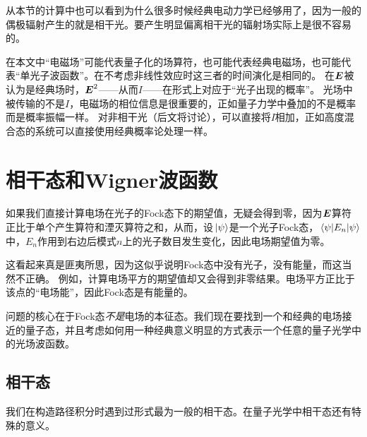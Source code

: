 从本节的计算中也可以看到为什么很多时候经典电动力学已经够用了，因为一般的偶极辐射产生的就是相干光。要产生明显偏离相干光的辐射场实际上是很不容易的。

在本文中“电磁场”可能代表量子化的场算符，也可能代表经典电磁场，也可能代表“单光子波函数”。在不考虑非线性效应时这三者的时间演化是相同的。
在$\vb*{E}$被认为是经典场时，$\vb*{E}^2$——从而$I$——在形式上对应于“光子出现的概率”。
光场中被传输的不是$I$，电磁场的相位信息是很重要的，正如量子力学中叠加的不是概率而是概率振幅一样。
对非相干光（后文将讨论），可以直接将$I$相加，正如高度混合态的系统可以直接使用经典概率论处理一样。

\section{相干态和Wigner波函数}

如果我们直接计算电场在光子的Fock态下的期望值，无疑会得到零，因为$\vb*{E}$算符正比于单个产生算符和湮灭算符之和，从而，设$\ket*{\psi}$是一个光子Fock态，$\mel{\psi}{E_n}{\psi}$中，$E_n$作用到右边后模式$n$上的光子数目发生变化，因此电场期望值为零。

这看起来真是匪夷所思，因为这似乎说明Fock态中没有光子，没有能量，而这当然不正确。
例如，计算电场平方的期望值却又会得到非零结果。电场平方正比于该点的“电场能”，因此Fock态是有能量的。

问题的核心在于Fock态\emph{不是}电场的本征态。我们现在要找到一个和经典的电场接近的量子态，并且考虑如何用一种经典意义明显的方式表示一个任意的量子光学中的光场波函数。

\subsection{相干态}



我们在构造路径积分时遇到过形式最为一般的相干态。在量子光学中相干态还有特殊的意义。

